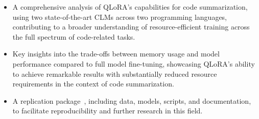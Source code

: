 \begin{itemize}
	\item A comprehensive analysis of QLoRA’s capabilities for code summarization, using two state-of-the-art CLMs across two programming languages, contributing to a broader understanding of resource-efficient training across the full spectrum of code-related tasks.

	\item Key insights into the trade-offs between memory usage and model performance compared to full model fine-tuning, showcasing QLoRA's ability to achieve remarkable results with substantially reduced resource requirements in the context of code summarization.
	
	\item A replication package~\cite{replication}, including data, models, scripts, and documentation, to facilitate reproducibility and further research in this field.
\end{itemize}

